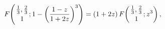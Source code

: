 \[\mathop{F\/}\nolimits\!\left({\frac{1}{3},\frac{2}{3}\atop 1};1-\left(\frac{1-%
z}{1+2z}\right)^{3}\right)=(1+2z)\mathop{F\/}\nolimits\!\left({\frac{1}{3},%
\frac{2}{3}\atop 1};z^{3}\right),\]